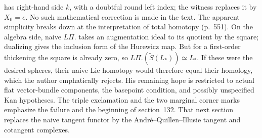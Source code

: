 \documentclass[10pt,oneside]{book}
\begin{document}
has right-hand side $k$, with a doubtful round left index; the witness replaces it by $X_0=e$. No such mathematical correction is made in the text. The apparent simplicity breaks down at the interpretation of total homotopy (p.~551). On the algebra side, naive $L\Pi.$ takes an augmentation ideal to its quotient by the square; dualizing gives the inclusion form of the Hurewicz map. But for a first-order thickening the square is already zero, so $L\Pi.(\widetilde S(L_*))\simeq L_*$. If these were the desired spheres, their naive Lie homotopy would therefore equal their homology, which the author emphatically rejects. His remaining hope is restricted to actual flat vector-bundle components, the basepoint condition, and possibly unspecified Kan hypotheses. The triple exclamation and the two marginal corner marks emphasize the failure and the beginning of section~132. That next section replaces the naive tangent functor by the Andr\'e--Quillen--Illusie tangent and cotangent complexes.
\end{document}
